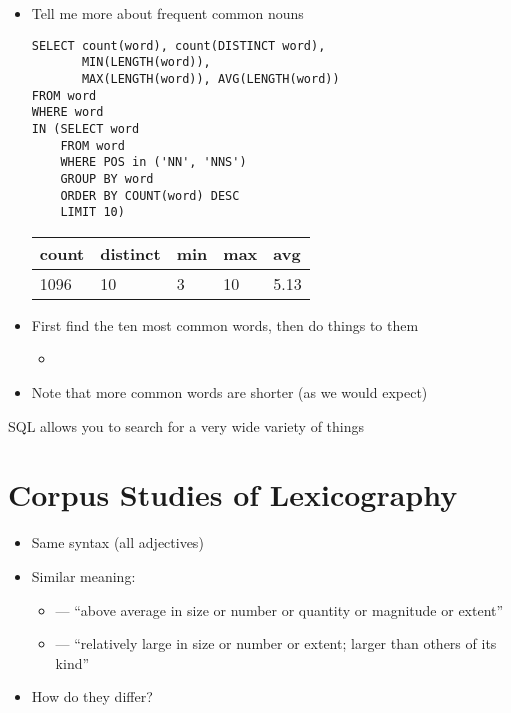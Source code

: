 \documentclass[a4paper,landscape,headrule,footrule,xetex]{foils}
\begin{document}

\begin{itemize}
\item Tell me more about frequent common nouns
\begin{verbatim}
SELECT count(word), count(DISTINCT word),
       MIN(LENGTH(word)), 
       MAX(LENGTH(word)), AVG(LENGTH(word))
FROM word
WHERE word 
IN (SELECT word
    FROM word
    WHERE POS in ('NN', 'NNS') 
    GROUP BY word
    ORDER BY COUNT(word) DESC
    LIMIT 10)

\end{verbatim}
  \begin{tabular}{lllll}
    \textbf{count}  & \textbf{distinct} &\textbf{min}  &  \textbf{max} & \textbf{avg} \\ \hline
    1096 & 10 & 3 & 10 & 5.13
  \end{tabular}
\item First find the ten most common words, then do things to them
  \begin{itemize}
  \item {}
  \end{itemize}
\item Note that more common words are shorter (as we would expect)
\end{itemize}
\begin{center}
  SQL allows you to search for a very wide variety of things
\end{center}


\section{Corpus Studies of Lexicography}


\begin{itemize}
\item Same syntax (all adjectives)
\item Similar meaning:
  \begin{itemize}
  \item {} --- ``above average in size or number or quantity or magnitude or extent'' 
  \item {} --- ``relatively large in size or number or extent; larger than others of its kind''  
\end{itemize}
\item How do they differ?
\end{itemize}
\end{document}
